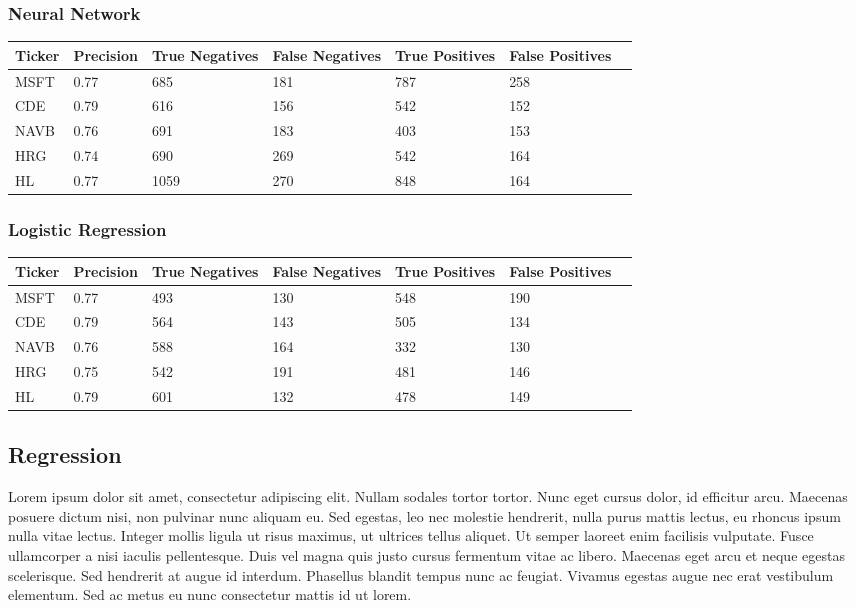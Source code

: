 \subsubsection{Neural Network}

\begin{center}
    \begin{tabular}{ | l | l | l | | l | l | l | p{5cm} |}
    \hline
    Ticker & Precision & True Negatives & False Negatives & True Positives & False Positives \\ \hline
    MSFT & 0.77 & 685 & 181 & 787 & 258 \\ \hline
    CDE & 0.79 & 616 & 156 & 542 & 152 \\ \hline
    NAVB & 0.76 & 691 & 183 & 403 & 153 \\ \hline
    HRG & 0.74 & 690 & 269 & 542 & 164 \\ \hline
    HL & 0.77 & 1059 & 270 & 848 & 164 \\
    \hline
    \end{tabular}
\end{center}

\subsubsection{Logistic Regression}

\begin{center}
    \begin{tabular}{ | l | l | l | | l | l | l | p{5cm} |}
    \hline
    Ticker & Precision & True Negatives & False Negatives & True Positives & False Positives \\ \hline
    MSFT & 0.77 & 493 & 130 & 548 & 190 \\ \hline
    CDE & 0.79 & 564 & 143 & 505 & 134 \\ \hline
    NAVB & 0.76 & 588 & 164 & 332 & 130 \\ \hline
    HRG & 0.75 & 542 & 191 & 481 & 146 \\ \hline
    HL & 0.79 & 601 & 132 & 478 & 149 \\
    \hline
    \end{tabular}
\end{center}

\subsection{Regression}
Lorem ipsum dolor sit amet, consectetur adipiscing elit. Nullam sodales tortor tortor. Nunc eget cursus dolor, id efficitur arcu. Maecenas posuere dictum nisi, non pulvinar nunc aliquam eu. Sed egestas, leo nec molestie hendrerit, nulla purus mattis lectus, eu rhoncus ipsum nulla vitae lectus. Integer mollis ligula ut risus maximus, ut ultrices tellus aliquet. Ut semper laoreet enim facilisis vulputate. Fusce ullamcorper a nisi iaculis pellentesque. Duis vel magna quis justo cursus fermentum vitae ac libero. Maecenas eget arcu et neque egestas scelerisque. Sed hendrerit at augue id interdum. Phasellus blandit tempus nunc ac feugiat. Vivamus egestas augue nec erat vestibulum elementum. Sed ac metus eu nunc consectetur mattis id ut lorem.

